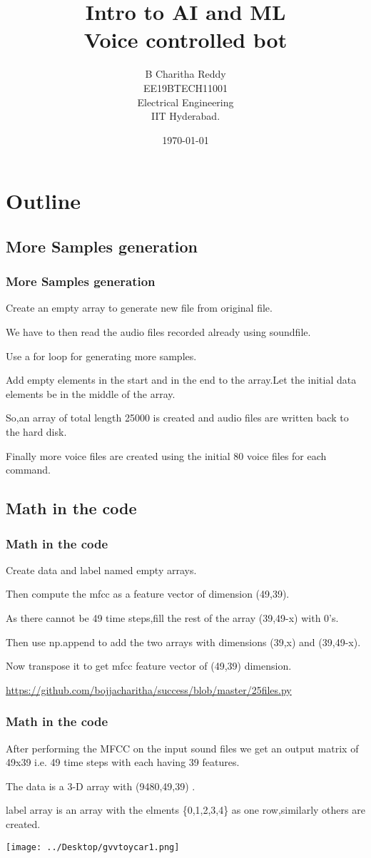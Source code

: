 \documentclass{beamer}
\title{Intro to AI and ML\\Voice controlled bot}
\author{B Charitha Reddy\\ EE19BTECH11001\\ Electrical Engineering\\IIT Hyderabad.}
\date{\today}
\theoremstyle{remark}
\numberwithin{equation}{section}
\begin{document}
\begin{frame}
\titlepage
\end{frame}

\section*{Outline}
\begin{frame}
\tableofcontents
\end{frame}


\begin{frame}
\section{More Samples generation}
\frametitle{More Samples generation}
Create an empty array to generate new file from original file.

We have to then read the audio files recorded already using soundfile.

Use a for loop for generating more samples.

Add empty elements in the start and in the end to the array.Let the initial data elements be in the middle of the array.

So,an array of total length 25000 is created and audio files are written back to the hard disk.

Finally more voice files are created using the initial 80 voice files for each command.
\end{frame}
\begin{frame}
\section{Math in the code}
\frametitle{Math in the code}
Create data and label named empty arrays.

Then compute the mfcc as a feature vector of dimension (49,39).

As there cannot be 49 time steps,fill the rest of the array (39,49-x) with 0's.

Then use np.append to add the two arrays with dimensions (39,x) and (39,49-x).

Now transpose it to get mfcc feature vector of (49,39) dimension.


\url{https://github.com/bojjacharitha/success/blob/master/25files.py}
\end{frame}
\begin{frame}
\frametitle{Math in the code}
After performing the MFCC on the input sound files we get an output matrix of 49x39 i.e. 49 time steps with each having 39 features.

The data is a 3-D array with (9480,49,39) .

label array is an array with the elments \{0,1,2,3,4\} as one row,similarly others are created.


\texttt{[image: ../Desktop/gvvtoycar1.png]} 
\end{frame}
\end{document}

